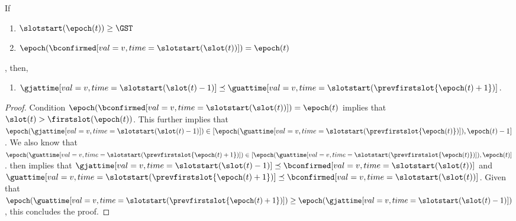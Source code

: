 \documentclass{article}
\begin{document}

\begin{lemma}\label{lem:gu-prev-slot-descendant-of-gj-prev-slot}
    If
    \begin{enumerate}
        \item $\slotstart(\epoch(t)) \geq \GST$
        \item $\epoch(\bconfirmed[val=v,time=\slotstart(\slot(t))]) = \epoch(t)$
    \end{enumerate},
    then,
    \begin{enumerate}
        \item $\gjattime[val=v,time=\slotstart(\slot(t)-1)] \preceq \guattime[val=v,time=\slotstart(\prevfirstslot{\epoch(t)+1})]$.
    \end{enumerate}
\end{lemma}

\begin{proof}
    Condition $\epoch(\bconfirmed[val=v,time=\slotstart(\slot(t))]) = \epoch(t)$ implies that $\slot(t) > \firstslot(\epoch(t))$.
    This further implies that $\epoch(\gjattime[val=v,time=\slotstart(\slot(t)-1)]) \in [\epoch(\guattime[val=v,time=\slotstart(\prevfirstslot{\epoch(t)})]),\epoch(t)-1]$.
    We also know that $\epoch(\guattime[val=v,time=\slotstart(\prevfirstslot{\epoch(t)+1})]) \in [\epoch(\guattime[val=v,time=\slotstart(\prevfirstslot{\epoch(t)})]),\epoch(t)]$.
     then implies that $\gjattime[val=v,time=\slotstart(\slot(t)-1)] \preceq \bconfirmed[val=v,time=\slotstart(\slot(t))]$ and $\guattime[val=v,time=\slotstart(\prevfirstslot{\epoch(t)+1})]\preceq \bconfirmed[val=v,time=\slotstart(\slot(t))]$.
    Given that $\epoch(\guattime[val=v,time=\slotstart(\prevfirstslot{\epoch(t)+1})])\geq\epoch(\gjattime[val=v,time=\slotstart(\slot(t)-1)] )$, this
    concludes the proof.
\end{proof}
\end{document}
